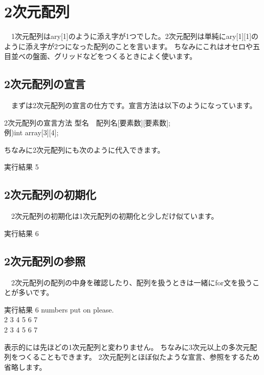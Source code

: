﻿\section{2次元配列}
　1次元配列はary[1]のように添え字が1つでした。2次元配列は単純にary[1][1]のように添え字が2つになった配列のことを言います。
ちなみにこれはオセロや五目並べの盤面、グリッドなどをつくるときによく使います。

\subsection{2次元配列の宣言}
　まずは2次元配列の宣言の仕方です。宣言方法は以下のようになっています。

\begin{itembox}{2次元配列の宣言方法}
型名　配列名[要素数][要素数];\\
例)int array[3][4];
\end{itembox}

ちなみに2次元配列にも次のように代入できます。


\begin{itembox}{実行結果}
5
\end{itembox}

\subsection{2次元配列の初期化}
　2次元配列の初期化は1次元配列の初期化と少しだけ似ています。



\begin{itembox}{実行結果}
6
\end{itembox}

\subsection{2次元配列の参照}
　2次元配列の配列の中身を確認したり、配列を扱うときは一緒にfor文を扱うことが多いです。



\begin{itembox}{実行結果}
6 numbers put on please.\\
2 3 4 5 6 7\\
2 3 4 5 6 7
\end{itembox}
表示的には先ほどの1次元配列と変わりません。
ちなみに3次元以上の多次元配列をつくることもできます。
2次元配列とほぼ似たような宣言、参照をするため省略します。